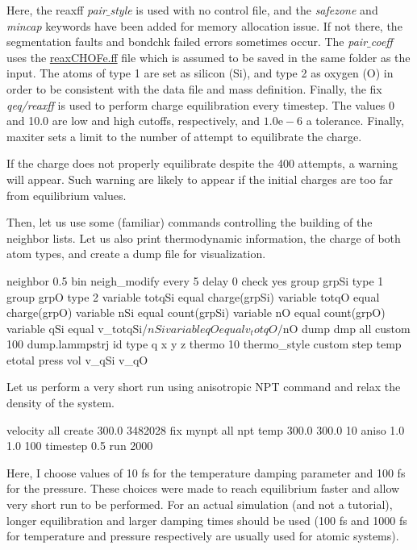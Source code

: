 \noindent Here, the reaxff \textit{pair$\_$style} is used with no control file, and the \textit{safezone} and \textit{mincap}
keywords have been added for memory allocation issue. If not there, the segmentation
faults and bondchk failed errors sometimes occur.
The \textit{pair$\_$coeff} uses the \href{../../../../../inputs/level3/reactive-silicon-dioxide/RelaxSilica/reaxCHOFe.ff}{reaxCHOFe.ff} file which is assumed to be saved in the
same folder as the input. The atoms of type 1 are set as silicon (Si),
and type 2 as oxygen (O) in order to be consistent with the data file and
mass definition.
Finally, the fix \textit{qeq/reaxff} is used to perform charge equilibration every timestep. The values 0 and 10.0
are low and high cutoffs, respectively, and $1.0 \text{e}-6$ a tolerance. Finally, maxiter sets
a limit to the number of attempt to equilibrate the charge. 

\begin{tcolorbox}[colback=mylightblue!5!white,colframe=mylightblue!75!black,title=Note]
If the charge does not
properly equilibrate despite the 400 attempts, a warning will appear. Such warning
are likely to appear if the initial charges are too far from equilibrium values. 
\end{tcolorbox}

\noindent Then, let us use some (familiar) commands controlling the building of the 
neighbor lists. Let us also print thermodynamic information, the charge of both atom types,
and create a dump file for visualization.

\begin{lcverbatim}
neighbor 0.5 bin
neigh_modify every 5 delay 0 check yes 
group grpSi type 1
group grpO type 2
variable totqSi equal charge(grpSi)
variable totqO equal charge(grpO)
variable nSi equal count(grpSi)
variable nO equal count(grpO)
variable qSi equal v_totqSi/${nSi}
variable qO equal v_totqO/${nO}
dump dmp all custom 100 dump.lammpstrj id type q x y z
thermo 10
thermo_style custom step temp etotal press vol v_qSi v_qO
\end{lcverbatim}

\noindent Let us perform a very short run using anisotropic NPT command
and relax the density of the system. 

\begin{lcverbatim}
velocity all create 300.0 3482028
fix mynpt all npt temp 300.0 300.0 10 aniso 1.0 1.0 100
timestep 0.5
run 2000
\end{lcverbatim}

\noindent \begin{tcolorbox}[colback=mylightblue!5!white,colframe=mylightblue!75!black,title=Note]
Here, I choose values of 10 fs for the temperature damping parameter and 100 fs
for the pressure. These choices were made to reach equilibrium faster and 
allow very short run to be performed. For an actual simulation (and not a tutorial),
longer equilibration and larger damping times should be used (100 fs and 1000 fs
for temperature and pressure respectively are usually used for atomic systems).
\end{tcolorbox}

